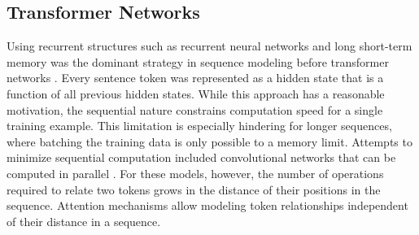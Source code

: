 \documentclass[../main.tex]{subfiles}
\begin{document}
\subsection{Transformer Networks}
\label{subsec:transformer}

Using recurrent structures such as recurrent neural networks
and long short-term memory \cite{Chung2014}
was the dominant strategy in sequence modeling
before transformer networks \cite{Vaswani2017}.
Every sentence token was represented as a hidden state
that is a function of all previous hidden states.
While this approach has a reasonable motivation,
the sequential nature constrains computation speed for a single training example.
This limitation is especially hindering for longer sequences,
where batching the training data is only possible to a memory limit.
Attempts to minimize sequential computation included convolutional networks
that can be computed in parallel \cite{Gehring2017}.
For these models, however,
the number of operations required to relate two tokens
grows in the distance of their positions in the sequence.
Attention mechanisms allow modeling token relationships
independent of their distance in a sequence.
\end{document}
